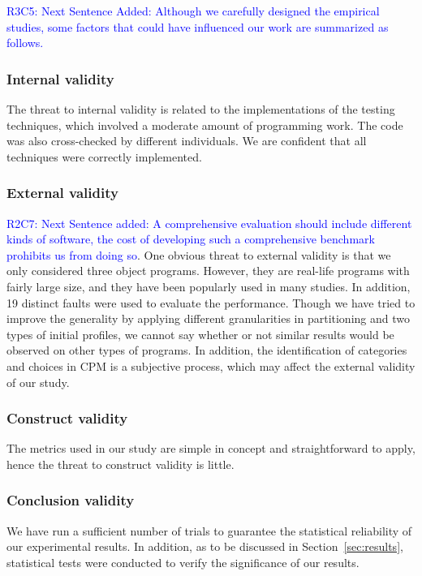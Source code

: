 \documentclass[10pt,journal,compsoc]{IEEEtran}
\begin{document}
\textcolor{blue}{R3C5: Next Sentence Added:
Although we carefully designed the empirical studies, some factors that could have influenced our work are summarized as follows.}

\subsubsection{Internal validity}
The threat to internal validity is related to the implementations of the testing techniques, which involved a moderate amount of programming work. The code was also cross-checked by different individuals. We are confident that all techniques were correctly implemented.

\subsubsection{External validity}
\textcolor{blue}{R2C7: Next Sentence added: A comprehensive evaluation should include different kinds of software, the cost of developing such a comprehensive benchmark prohibits us from doing so}. One obvious threat to external validity is that we only considered three object programs. However, they are real-life programs with fairly large size, and they have been popularly used in many studies. In addition, 19 distinct faults were used to evaluate the performance. Though we have tried to improve the generality by applying different granularities in partitioning and two types of initial profiles, we cannot say whether or not similar results would be observed on other types of programs. In addition, the identification of categories and choices in CPM is a subjective process, which may affect the external validity of our study.

\subsubsection{Construct validity}
The metrics used in our study are simple in concept and straightforward to apply, hence the threat to construct validity is little.

\subsubsection{Conclusion validity}
We have run a sufficient number of trials to guarantee the statistical reliability of our experimental results. In addition, as to be discussed in Section~\ref{sec:results}, statistical tests were conducted to verify the significance of our results.
\end{document}
